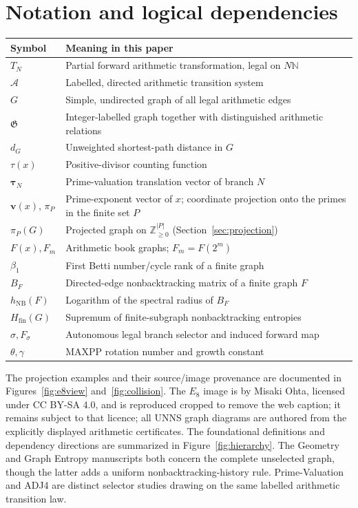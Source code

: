 \documentclass[11pt,a4paper]{article}
\theoremstyle{definition}\newtheorem{definition}[theorem]{Definition}
\newcommand{\N}{\mathbb N}
\newcommand{\A}{\mathcal A}
\newcommand{\G}{\mathfrak G}
\newcommand{\NB}{\mathrm{NB}}
\providecommand{\vv}{}
\renewcommand{\vv}{\mathbf v}
\begin{document}
\section{Notation and logical dependencies}
\label{app:notation}
\begin{center}\small
\begin{tabularx}{\textwidth}{@{}lX@{}}
\toprule
Symbol & Meaning in this paper\\
\midrule
$T_N$ & Partial forward arithmetic transformation, legal on $N\N$\\
$\A$ & Labelled, directed arithmetic transition system\\
$G$ & Simple, undirected graph of all legal arithmetic edges\\
$\G$ & Integer-labelled graph together with distinguished arithmetic relations\\
$d_G$ & Unweighted shortest-path distance in $G$\\
$\tau(x)$ & Positive-divisor counting function\\
$\boldsymbol\tau_N$ & Prime-valuation translation vector of branch $N$\\
$\vv(x)$, $\pi_P$ & Prime-exponent vector of $x$; coordinate projection onto the primes in the finite set $P$\\
$\pi_P(G)$ & Projected graph on $\mathbb Z_{\ge0}^{|P|}$ (Section~\ref{sec:projection})\\
$F(x),F_m$ & Arithmetic book graphs; $F_m=F(2^m)$\\
$\beta_1$ & First Betti number/cycle rank of a finite graph\\
$B_F$ & Directed-edge nonbacktracking matrix of a finite graph $F$\\
$h_{\NB}(F)$ & Logarithm of the spectral radius of $B_F$\\
$H_{\mathrm{fin}}(G)$ & Supremum of finite-subgraph nonbacktracking entropies\\
$\sigma,F_\sigma$ & Autonomous legal branch selector and induced forward map\\
$\theta,\gamma$ & MAXPP rotation number and growth constant\\
\bottomrule
\end{tabularx}
\end{center}

The projection examples and their source/image provenance are documented in Figures~\ref{fig:e8view} and~\ref{fig:collision}. The $E_8$ image is by Misaki Ohta, licensed under CC BY-SA 4.0, and is reproduced cropped to remove the web caption; it remains subject to that licence; all UNNS graph diagrams are authored from the explicitly displayed arithmetic certificates. The foundational definitions and dependency directions are summarized in Figure~\ref{fig:hierarchy}. The Geometry and Graph Entropy manuscripts both concern the complete unselected graph, though the latter adds a uniform nonbacktracking-history rule. Prime-Valuation and ADJ4 are distinct selector studies drawing on the same labelled arithmetic transition law.
\end{document}
